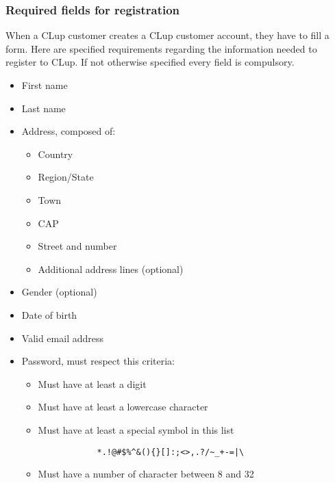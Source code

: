 \subsubsection{Required fields for registration}
When a CLup customer creates a CLup customer account, they have to fill a form. Here are specified requirements regarding the information needed to register to CLup. If not otherwise specified every field is compulsory. 

\begin{itemize}
    \item First name
    \item Last name
    \item Address, composed of:
    \begin{itemize}
        \item Country
        \item Region/State 
        \item Town
        \item CAP 
        \item Street and number
        \item Additional address lines (optional)
    \end{itemize}
    \item Gender (optional)
    \item Date of birth
    \item Valid email address
    \item Password, must respect this criteria: 
    \begin{itemize}
        \item Must have at least a digit
        \item Must have at least a lowercase character
        \item Must have at least a special symbol in this list
        \begin{verbatim}
            *.!@#$%^&(){}[]:;<>,.?/~_+-=|\
        \end{verbatim}
        \item Must have a number of character between 8 and 32 
    \end{itemize}
\end{itemize}